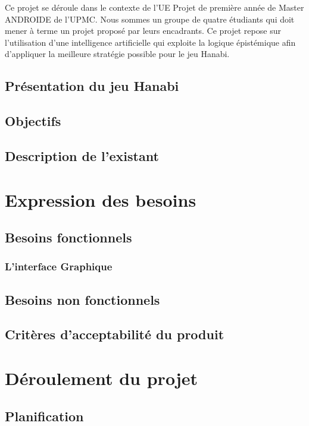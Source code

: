 \documentclass[11pt, letterpaper]{article}
\begin{document}
\noindent 
Ce projet se déroule dans le contexte de l'UE Projet de première année de Master ANDROIDE de l'UPMC. Nous sommes un groupe de quatre étudiants qui doit mener à terme un projet proposé par leurs encadrants. Ce projet repose sur l'utilisation d'une intelligence artificielle qui exploite la logique épistémique afin d'appliquer la meilleure stratégie possible pour le jeu Hanabi.

\subsection*{Présentation du jeu Hanabi}

\subsection*{Objectifs}

\subsection*{Description de l'existant}

\section {Expression des besoins}

\subsection{Besoins fonctionnels}

\subsubsection{L'interface Graphique}

\subsection{Besoins non fonctionnels}

\subsection{Critères d'acceptabilité du produit}

\section{Déroulement du projet}

\subsection{Planification}
\end{document}
